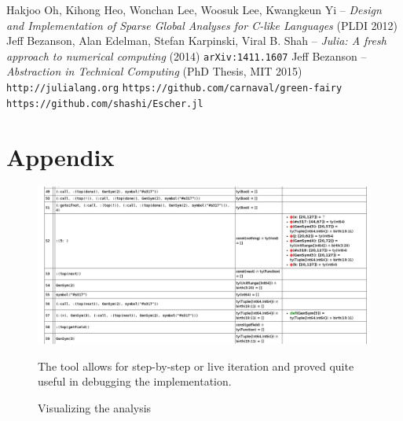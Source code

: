 \documentclass[11pt]{article}
\begin{document}
\begin{thebibliography}{9}
 Hakjoo Oh, Kihong Heo, Wonchan Lee, Woosuk Lee, Kwangkeun Yi -- \emph{Design and Implementation of Sparse Global Analyses for C-like Languages} (PLDI 2012)
 Jeff Bezanson, Alan Edelman, Stefan Karpinski, Viral B. Shah -- \emph{Julia: A fresh approach to numerical computing} (2014) \verb~arXiv:1411.1607~
 Jeff Bezanson -- \emph{Abstraction in Technical Computing} (PhD Thesis, MIT 2015)
 \verb~http://julialang.org~
 \verb~https://github.com/carnaval/green-fairy~
 \verb~https://github.com/shashi/Escher.jl~
\end{thebibliography}
\clearpage
\section*{Appendix}

\begin{figure}[H]
\includegraphics[scale=0.3]{capt.png}
\caption{Visualizing the analysis}
The tool allows for step-by-step or live iteration and proved quite useful in debugging the implementation.
\end{figure}
\end{document}

